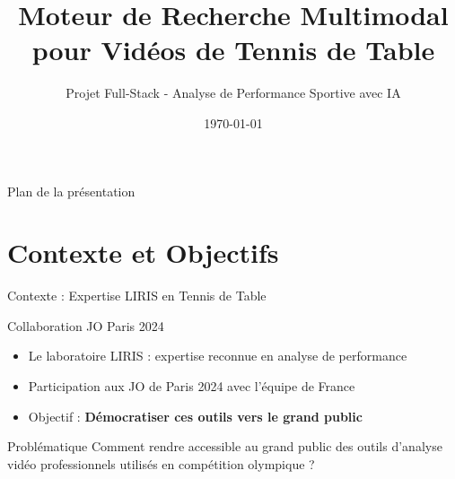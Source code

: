 \documentclass[11pt]{beamer}
\title[Recherche Vidéo Tennis de Table]{Moteur de Recherche Multimodal\\pour Vidéos de Tennis de Table}
\subtitle{Projet Full-Stack - Analyse de Performance Sportive avec IA}
\institute[Projet Informatique]{Projet Informatique}
\date{\today}
\begin{document}
\begin{frame}
\titlepage
\end{frame}

\begin{frame}{Plan de la présentation}
\tableofcontents
\end{frame}

\section{Contexte et Objectifs}

\begin{frame}{Contexte : Expertise LIRIS en Tennis de Table}
\begin{block}{Collaboration JO Paris 2024}
\begin{itemize}
    \item Le laboratoire LIRIS : expertise reconnue en analyse de performance
    \item Participation aux JO de Paris 2024 avec l'équipe de France
    \item Objectif : \textbf{Démocratiser ces outils vers le grand public}
\end{itemize}
\end{block}

\vspace{0.3cm}

\begin{block}{Problématique}
Comment rendre accessible au grand public des outils d'analyse vidéo professionnels utilisés en compétition olympique ?
\end{block}
\end{frame}
\end{document}
